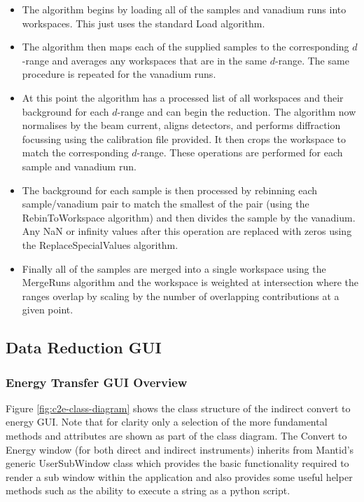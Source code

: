 \documentclass[paper=a4, fontsize=11pt]{scrartcl}	%
\numberwithin{equation}{section}															%
\numberwithin{figure}{section}																%
\numberwithin{table}{section}																%
\begin{document}
\begin{itemize}
\item The algorithm begins by loading all of the samples and vanadium runs into workspaces. This just uses the standard Load algorithm.

\item The algorithm then maps each of the supplied samples to the corresponding $d$-range and averages any workspaces that are in the same $d$-range. The same procedure is repeated for the vanadium runs.

\item At this point the algorithm has a processed list of all workspaces and their background for each $d$-range and can begin the reduction. The algorithm now normalises by the beam current, aligns detectors, and performs diffraction focussing using the calibration file provided. It then crops the workspace to match the corresponding $d$-range. These operations are performed for each sample and vanadium run.

\item The background for each sample is then processed by rebinning each sample/vanadium pair to match the smallest of the pair (using the RebinToWorkspace algorithm) and then divides the sample by the vanadium. Any NaN or infinity values after this operation are replaced with zeros using the ReplaceSpecialValues algorithm.

\item Finally all of the samples are merged into a single workspace using the MergeRuns algorithm and the workspace is weighted at intersection where the ranges overlap by scaling by the number of overlapping contributions at a given point.
\end{itemize}

\subsection{Data Reduction GUI}

\subsubsection{Energy Transfer GUI Overview}
\label{subsec:c2e-gui-overview}
Figure \ref{fig:c2e-class-diagram} shows the class structure of the indirect convert to energy GUI. Note that for clarity only a selection of the more fundamental methods and attributes are shown as part of the class diagram. The Convert to Energy window (for both direct and indirect instruments) inherits from Mantid's generic UserSubWindow class which provides the basic functionality required to render a sub window within the application and also provides some useful helper methods such as the ability to execute a string as a python script.
\end{document}
